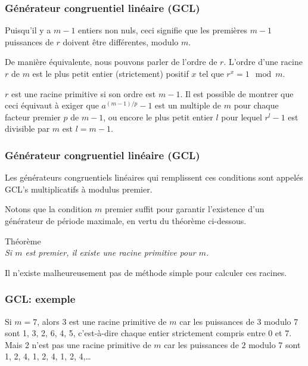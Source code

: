 \documentclass[t,usepdftitle=false]{beamer}
\begin{document}
\begin{frame}
\frametitle{Générateur congruentiel linéaire (GCL)}

Puisqu'il y a $m-1$ entiers non nuls, ceci signifie que les premières $m-1$ puissances de $r$ doivent être différentes, modulo $m$.

\mbox{}

De manière équivalente, nous pouvons parler de l'ordre de $r$.
L'ordre d'une racine $r$ de $m$ est le plus petit entier (strictement)
positif $x$ tel que $r^x = 1 \mod m$.

\mbox{}

$r$ est une racine primitive si son ordre est $m-1$.
Il est possible de montrer que ceci équivaut à exiger que $a^{(m -
  1)/p} - 1$ est un multiple de $m$ pour chaque facteur premier $p$ de
$m - 1$, ou encore le plus petit entier $l$ pour lequel $r^l-1$ est
divisible par $m$ est $l = m-1$. %

\end{frame}

\begin{frame}
\frametitle{Générateur congruentiel linéaire (GCL)}

Les générateurs congruentiels linéaires qui remplissent ces conditions
sont appelés GCL's multiplicatifs à modulus premier.

\mbox{}

Notons que la condition $m$ premier suffit pour garantir l'existence d'un générateur de période maximale,
en vertu du théorème ci-dessous.

\mbox{}

{\red Théorème}\\
\textit{
Si $m$ est premier, il existe une racine primitive pour $m$.
}

\mbox{}

Il n'existe malheureusement pas de méthode simple pour calculer ces racines.\\

\end{frame}

\begin{frame}
\frametitle{GCL: exemple}

Si $m=7$, alors 3 est une racine primitive de $m$ car les puissances
de 3 modulo 7 sont 1, 3, 2, 6, 4, 5, c'est-à-dire chaque entier strictement
compris entre 0 et 7.
Mais 2 n'est pas une racine primitive de $m$ car les puissances de $2$ modulo 7
sont 1, 2, 4, 1, 2, 4, 1, 2, 4,\ldots

\end{frame}
\end{document}

